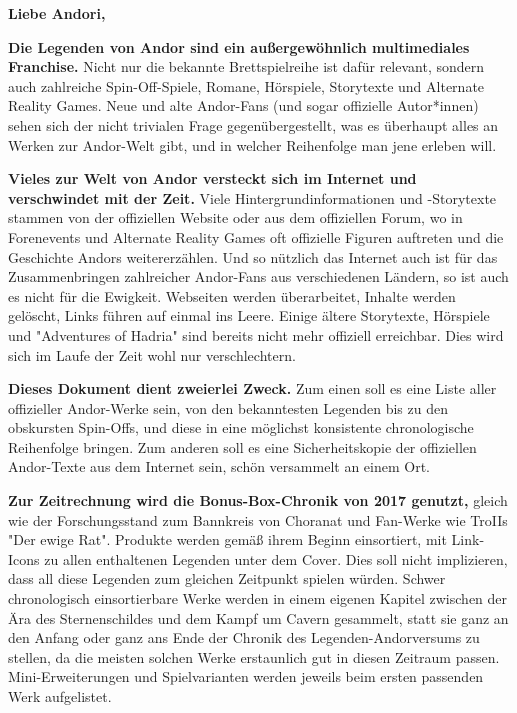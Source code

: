 \documentclass[10pt, a4paper, oneside]{book}
\begin{document}
\maketitle







\thispagestyle{plain}%


\setcounter{page}{3} %

\textbf{Liebe Andori,}

\begin{multicols}{2}

\textbf{Die Legenden von Andor sind ein außergewöhnlich multimediales Franchise.} Nicht nur die bekannte Brettspielreihe ist dafür relevant, sondern auch zahlreiche Spin-Off-Spiele, Romane, Hörspiele, Storytexte und Alternate Reality Games. Neue und alte Andor-Fans (und sogar offizielle Autor*innen) sehen sich der nicht trivialen Frage gegenübergestellt, was es überhaupt alles an Werken zur Andor-Welt gibt, und in welcher Reihenfolge man jene erleben will.\bigskip

\textbf{Vieles zur Welt von Andor versteckt sich im Internet und verschwindet mit der Zeit.} Viele Hintergrundinformationen und -Storytexte stammen von der offiziellen Website oder aus dem offiziellen Forum, wo in Forenevents und Alternate Reality Games oft offizielle Figuren auftreten und die Geschichte Andors weitererzählen. Und so nützlich das Internet auch ist für das Zusammenbringen zahlreicher Andor-Fans aus verschiedenen Ländern, so ist auch es nicht für die Ewigkeit. Webseiten werden überarbeitet, Inhalte werden gelöscht, Links führen auf einmal ins Leere. Einige ältere Storytexte, Hörspiele und "Adventures of Hadria" sind bereits nicht mehr offiziell erreichbar. Dies wird sich im Laufe der Zeit wohl nur verschlechtern.\bigskip

\textbf{Dieses Dokument dient zweierlei Zweck. } 
Zum einen soll es eine Liste aller offizieller Andor-Werke sein, von den bekanntesten Legenden bis zu den obskursten Spin-Offs, und diese in eine möglichst konsistente chronologische Reihenfolge bringen.
Zum anderen soll es eine Sicherheitskopie der offiziellen Andor-Texte aus dem Internet sein, schön versammelt an einem Ort.\bigskip

\textbf{Zur Zeitrechnung wird die Bonus-Box-Chronik von 2017 genutzt,} gleich wie der Forschungsstand zum Bannkreis von Choranat und Fan-Werke wie TroIIs "Der ewige Rat". Produkte werden gemäß ihrem Beginn einsortiert, mit Link-Icons zu allen enthaltenen Legenden unter dem Cover. Dies soll nicht implizieren, dass all diese Legenden zum gleichen Zeitpunkt spielen würden. Schwer chronologisch einsortierbare Werke werden in einem eigenen Kapitel zwischen der Ära des Sternenschildes und dem Kampf um Cavern gesammelt, statt sie ganz an den Anfang oder ganz ans Ende der Chronik des Legenden-Andorversums zu stellen, da die meisten solchen Werke erstaunlich gut in diesen Zeitraum passen. Mini-Erweiterungen und Spielvarianten werden jeweils beim ersten passenden Werk aufgelistet.\bigskip


\end{multicols}
\end{document}
